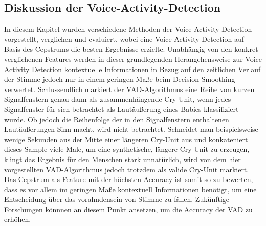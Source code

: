 \subsection{Diskussion der Voice-Activity-Detection}

In diesem Kapitel wurden verschiedene Methoden der Voice Activity Detection vorgestellt, verglichen und evaluiert, wobei eine Voice Activity Detection auf Basis des Cepstrums die besten Ergebnisse erzielte. Unabhängig von den konkret verglichenen Features werden in dieser grundlegenden Herangehensweise zur Voice Activity Detection kontextuelle Informationen in Bezug auf den zeitlichen Verlauf der Stimme jedoch nur in einem geringen Maße beim Decision-Smoothing verwertet. Schlussendlich markiert der VAD-Algorithmus eine Reihe von kurzen Signalfenstern genau dann als zusammenhängende Cry-Unit, wenn jedes Signalfenster für sich betrachtet als Lautäußerung eines Babies klassifiziert wurde. Ob jedoch die Reihenfolge der in den Signalfenstern enthaltenen Lautäußerungen Sinn macht, wird nicht betrachtet. Schneidet man beispielsweise wenige Sekunden aus der Mitte einer längeren Cry-Unit aus und konkateniert dieses Sample viele Male, um eine synthetische, längere Cry-Unit zu erzeugen, klingt das Ergebnis für den Menschen stark unnatürlich, wird von dem hier vorgestellten VAD-Algorithmus jedoch trotzdem als valide Cry-Unit markiert. Das Cepstrum als Feature mit der höchsten Accuracy ist somit so zu bewerten, dass es vor allem im geringen Maße kontextuell Informationen benötigt, um eine Entscheidung über das vorahndensein von Stimme zu fällen. Zukünftige Forschungen könnnen an diesem Punkt ansetzen, um die Accuracy der VAD zu erhöhen.
